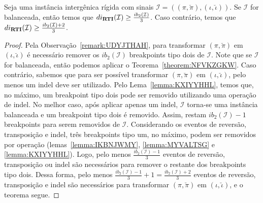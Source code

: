 \begin{theorem}\label{theorem:JGVDYLDM}
Seja uma instância intergênica rígida com sinais $\mathcal{I} = ((\pi,\breve\pi),(\iota,\breve\iota))$. Se $\mathcal{I}$ for balanceada, então temos que $di_{\textbf{RTI}}(\mathcal{I}) \ge \frac{ib_2(\mathcal{I})}{3}$. Caso contrário, temos que $di_{\textbf{RTI}}(\mathcal{I}) \ge \frac{ib_2(\mathcal{I}) + 2}{3}$.
\end{theorem}
\begin{proof}
Pela Observação~\ref{remark:UDYJTHAH}, para transformar $(\pi,\breve\pi)$ em $(\iota,\breve\iota)$ é necessário remover os $ib_2(\mathcal{I})$ breakpoints tipo dois de $\mathcal{I}$. Note que se $\mathcal{I}$ for balanceada, então podemos aplicar o Teorema~\ref{theorem:NFVKZGKW}. Caso contrário, sabemos que para ser possível transformar $(\pi,\breve\pi)$ em $(\iota,\breve\iota)$, pelo menos um indel deve ser utilizado. Pelo Lema~\ref{lemma:KXIYYHHL}, temos que, no máximo, um breakpoint tipo dois pode ser removido utilizando uma operação de indel. No melhor caso, após aplicar apenas um indel, $\mathcal{I}$  torna-se uma instância balanceada e um breakpoint tipo dois é removido. Assim, restam $ib_2(\mathcal{I}) - 1$ breakpoints para serem removidos de $\mathcal{I}$. Considerando os eventos de reversão, transposição e indel, três breakpoints tipo um, no máximo, podem ser removidos por operação (lemas~\ref{lemma:IKBNJWMY}, \ref{lemma:MYVALTSG} e \ref{lemma:KXIYYHHL}). Logo, pelo menos $\frac{ib_2(\mathcal{I}) - 1}{3}$ eventos de reversão, transposição ou indel são necessários para remover o restante dos breakpoints tipo dois. Dessa forma, pelo menos $\frac{ib_2(\mathcal{I}) - 1}{3} + 1 = \frac{ib_2(\mathcal{I}) + 2}{3}$ eventos de reversão, transposição e indel são necessários para transformar $(\pi,\breve\pi)$ em $(\iota,\breve\iota)$, e o teorema segue.
\end{proof}

